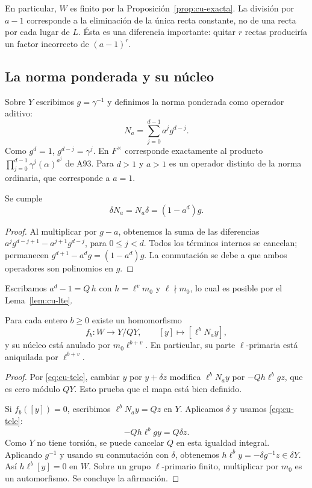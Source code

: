 En particular, $W$ es finito por la Proposición~\ref{prop:cu-exacta}. La división por $a-1$ corresponde a la eliminación de la única recta constante, no de una recta por cada lugar de $L$. Ésta es una diferencia importante: quitar $r$ rectas produciría un factor incorrecto de $(a-1)^r$.

\subsection{La norma ponderada y su núcleo}

Sobre $Y$ escribimos $g=\gamma^{-1}$ y definimos la norma ponderada como operador aditivo:
\begin{equation}
 N_a=\sum_{j=0}^{d-1} a^j g^{d-j}.
 \label{eq:cu-norma}
\end{equation}
Como $g^d=1$, $g^{d-j}=\gamma^j$. En $F^\times$ corresponde exactamente al producto $\prod_{j=0}^{d-1}\gamma^j(\alpha)^{a^j}$ de A93. Para $d>1$ y $a>1$ es un operador distinto de la norma ordinaria, que corresponde a $a=1$.

\begin{lema}
\label{lem:cu-tele}
Se cumple
\begin{equation}
 \delta N_a=N_a\delta=(1-a^d)g.
 \label{eq:cu-tele}
\end{equation}
\end{lema}
\begin{proof}
Al multiplicar por $g-a$, obtenemos la suma de las diferencias
$a^jg^{d-j+1}-a^{j+1}g^{d-j}$, para $0\le j<d$. Todos los términos internos se cancelan; permanecen $g^{d+1}-a^dg=(1-a^d)g$. La conmutación se debe a que ambos operadores son polinomios en $g$.
\end{proof}

Escribamos $a^d-1=Q\,h$ con $h=\ell^v m_0$ y $\ell\nmid m_0$, lo cual es posible por el Lema~\ref{lem:cu-lte}.

\begin{proposicion}
\label{prop:cu-ker}
Para cada entero $b\ge0$ existe un homomorfismo
\begin{equation}
 f_b:W\longrightarrow Y/QY,\qquad
 [y]\longmapsto [\ell^bN_a y],
 \label{eq:cu-fb}
\end{equation}
y su núcleo está anulado por $m_0\ell^{b+v}$. En particular, su parte $\ell$-primaria está aniquilada por $\ell^{b+v}$.
\end{proposicion}
\begin{proof}
Por \eqref{eq:cu-tele}, cambiar $y$ por $y+\delta z$ modifica $\ell^bN_a y$ por $-Qh\ell^b gz$, que es cero módulo $QY$. Esto prueba que el mapa está bien definido.

Si $f_b([y])=0$, escribimos $\ell^bN_a y=Qz$ en $Y$. Aplicamos $\delta$ y usamos \eqref{eq:cu-tele}:
\[
 -Qh\ell^b gy=Q\delta z.
\]
Como $Y$ no tiene torsión, se puede cancelar $Q$ en esta igualdad integral. Aplicando $g^{-1}$ y usando su conmutación con $\delta$, obtenemos $h\ell^b y=-\delta g^{-1}z\in\delta Y$. Así $h\ell^b[y]=0$ en $W$. Sobre un grupo $\ell$-primario finito, multiplicar por $m_0$ es un automorfismo. Se concluye la afirmación.
\end{proof}

